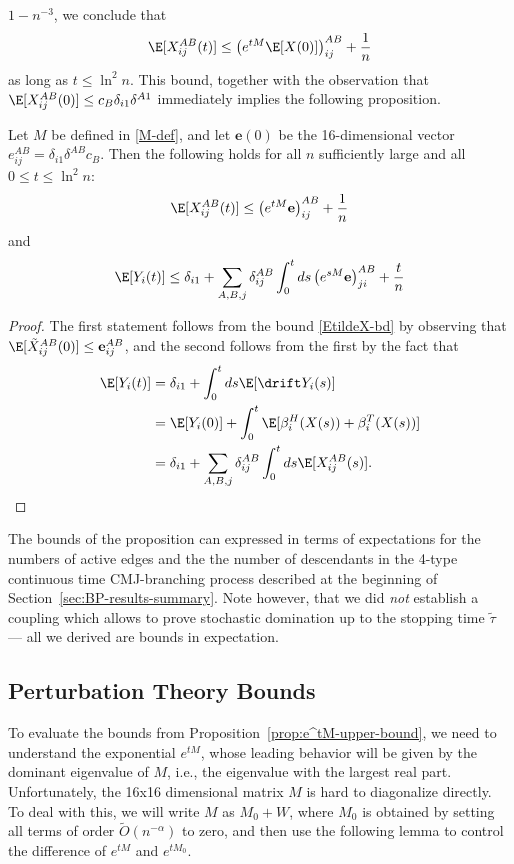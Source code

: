 \documentclass[11pt]{article}
\begin{document}
$1-n^{-3}$, we conclude that
\begin{equation}\label{EtildeX-bd}
\E[X_{ij}^{AB}(t)]\leq \left(e^{tM}\E[X(0)]\right)_{ij}^{AB} +\frac 1n
\end{equation}
as long as $t\leq \ln^2 n$.  This  bound, together with the observation that
$\E[X_{ij}^{AB}(0)]\leq c_B\delta_{i1}\delta^{A1}$
immediately implies the  following proposition.
\begin{proposition}\label{prop:e^tM-upper-bound}
Let $M$   be defined in \eqref{M-def}, and let
$\mathbf e(0)$ be the 16-dimensional vector $e_{ij}^{AB}=\delta_{i1}\delta^{AB}c_B$.  Then the following holds for all $n$ sufficiently large and all $0\leq t\leq \ln^2n$:
$$
\E[X_{ij}^{AB}(t)]\leq\left(e^{tM}\mathbf e\right)_{ij}^{AB} +\frac 1n
$$
and
$$
\E[Y_i(t)]\leq \delta_{i1}+
\sum_{A,B,j}\delta_{ij}^{AB}\int_0^tds \left(e^{sM}\mathbf e\right)_{ji}^{AB}
+\frac tn
$$
\end{proposition}
\begin{proof}
The first statement  follows from the bound \eqref{EtildeX-bd} by observing that $\E[\tilde X_{ij}^{AB}(0)]\leq \mathbf e_{ij}^{AB}$, and the second follows from the first by the fact that 
\begin{align*}
    \E[Y_i(t)] &= \delta_{i1}+\int_0^t ds\E[\drift Y_i(s)] \\
    &=\E[Y_i(0)]+     \int_0^t \E[\beta_i^H(X(s))+\beta_i^T(X(s))]\\
    &=\delta_{i1} + \sum_{A,B,j}\delta_{ij}^{AB}\int_0^tds\E[X_{ij}^{AB}(s)].
\end{align*}
\end{proof}
\begin{remark}
The bounds of the proposition can expressed in terms of expectations for the numbers of active edges and the the number of descendants in the
 4-type continuous time CMJ-branching process described at the beginning of Section~\ref{sec:BP-results-summary}. Note however, that we did \textit{not} establish a coupling which allows to prove stochastic domination up to the stopping time $\tilde\tau$ --- all we derived are bounds in expectation.
\end{remark}


\subsection{Perturbation Theory Bounds}
\label{sec:perturbation_bounds}

To evaluate the bounds from Proposition~\ref{prop:e^tM-upper-bound}, we need to understand the exponential $e^{tM}$, whose leading behavior will be given by the dominant eigenvalue of $M$, i.e., the eigenvalue with the largest real part.  Unfortunately, the 16x16 dimensional matrix $M$ is hard to diagonalize directly.  To deal with this, we will write $M$ as $M_0+W$, where $M_0$ is 
obtained by setting all terms of order $\tilde O(n^{-\alpha})$ to zero, and then use the following lemma to control the difference of $e^{tM}$ and $e^{tM_0}$.
\end{document}
